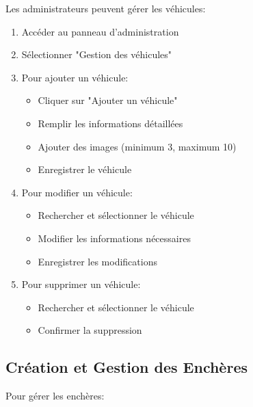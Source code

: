Les administrateurs peuvent gérer les véhicules:

\begin{enumerate}
    \item Accéder au panneau d'administration
    \item Sélectionner "Gestion des véhicules"
    \item Pour ajouter un véhicule:
    \begin{itemize}
        \item Cliquer sur "Ajouter un véhicule"
        \item Remplir les informations détaillées
        \item Ajouter des images (minimum 3, maximum 10)
        \item Enregistrer le véhicule
    \end{itemize}
    \item Pour modifier un véhicule:
    \begin{itemize}
        \item Rechercher et sélectionner le véhicule
        \item Modifier les informations nécessaires
        \item Enregistrer les modifications
    \end{itemize}
    \item Pour supprimer un véhicule:
    \begin{itemize}
        \item Rechercher et sélectionner le véhicule
        \item Confirmer la suppression
    \end{itemize}
\end{enumerate}

\subsection{Création et Gestion des Enchères}

Pour gérer les enchères:

